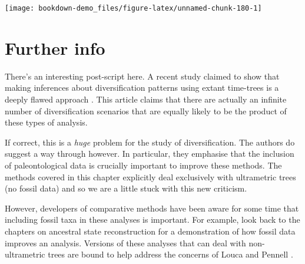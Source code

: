 \documentclass[
]{book}
\newenvironment{Shaded}{\begin{snugshade}}{\end{snugshade}}
\newcommand{\DataTypeTok}[1]{\textcolor[rgb]{0.13,0.29,0.53}{#1}}
\newcommand{\DecValTok}[1]{\textcolor[rgb]{0.00,0.00,0.81}{#1}}
\newcommand{\KeywordTok}[1]{\textcolor[rgb]{0.13,0.29,0.53}{\textbf{#1}}}
\newcommand{\NormalTok}[1]{#1}
\newcommand{\OperatorTok}[1]{\textcolor[rgb]{0.81,0.36,0.00}{\textbf{#1}}}
\newcommand{\StringTok}[1]{\textcolor[rgb]{0.31,0.60,0.02}{#1}}
\begin{document}
\begin{Shaded}
\end{Shaded}

\begin{center}\texttt{[image: bookdown-demo\_files/figure-latex/unnamed-chunk-180-1]} \end{center}

\hypertarget{further-info-4}{%
\section{Further info}\label{further-info-4}}

There's an interesting post-script here. A recent study claimed to show that making inferences about diversification patterns using extant time-trees is a deeply flawed approach \citep{Louca20}. This article claims that there are actually an infinite number of diversification scenarios that are equally likely to be the product of these types of analysis.

If correct, this is a \emph{huge} problem for the study of diversification. The authors do suggest a way through however. In particular, they emphasise that the inclusion of paleontological data is crucially important to improve these methods. The methods covered in this chapter explicitly deal exclusively with ultrametric trees (no fossil data) and so we are a little stuck with this new criticism.

However, developers of comparative methods have been aware for some time that including fossil taxa in these analyses is important. For example, look back to the chapters on ancestral state reconstruction for a demonstration of how fossil data improves an analysis. Versions of these analyses that can deal with non-ultrametric trees are bound to help address the concerns of Louca and Pennell \citeyearpar{Louca20}.
\end{document}
